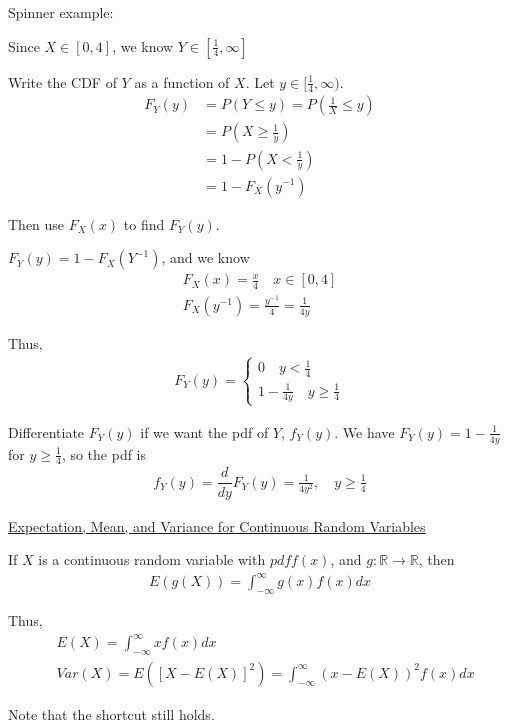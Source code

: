 \documentclass{article}
\begin{document}
Spinner example:

Since $X \in [0,4]$, we know $Y \in [\frac{1}{4}, \infty]$

Write the CDF of $Y$ as a function of $X$. Let $y \in [\frac{1}{4},\infty)$.
\begin{align*}
    F_Y(y) &= P(Y \le y) = P\left (\frac{1}{X} \le y\right ) \\
    &= P\left (X \ge \frac{1}{y}\right ) \\
    &= 1 - P\left (X < \frac{1}{y}\right) \\
    &= 1 - F_X\left(y^{-1}\right)
\end{align*}

Then use $F_X(x)$ to find $F_Y(y)$.

$F_Y(y) = 1 - F_X(Y^{-1})$, and we know
\begin{align*}
    F_X(x) = \frac{x}{4} \quad x \in [0,4]\\
    F_X(y^{-1}) = \frac{y^{-1}}{4} = \frac{1}{4y}
\end{align*}

Thus,
\begin{align*}
    F_Y(y) = \begin{cases}
        0 \quad y < \frac{1}{4} \\
        1 - \frac{1}{4y} \quad y \ge \frac{1}{4}
    \end{cases}
\end{align*}

Differentiate $F_Y(y)$ if we want the pdf of $Y$, $f_Y(y)$. We have $F_Y(y) = 1 - \frac{1}{4y}$ for $y \ge \frac{1}{4}$, so the pdf is
\begin{align*}
    f_Y(y) = \dfrac{d}{dy}F_Y(y) = \frac{1}{4y^2}, \quad y \ge \frac{1}{4}
\end{align*}

\underline{Expectation, Mean, and Variance for Continuous Random Variables}

If $X$ is a continuous random variable with $pdf f(x)$, and $g : \mathbb{R} \to \mathbb{R}$, then
\begin{align*}
    E(g(X)) = \int_{-\infty}^{\infty}g(x)f(x)dx
\end{align*}

Thus,
\begin{align*}
    &E(X) = \int_{-\infty}^{\infty}xf(x)dx \\
    &Var(X) = E([X-E(X)]^2) = \int_{-\infty}^{\infty}(x-E(X))^2f(x)dx
\end{align*}

Note that the shortcut still holds.
\end{document}
